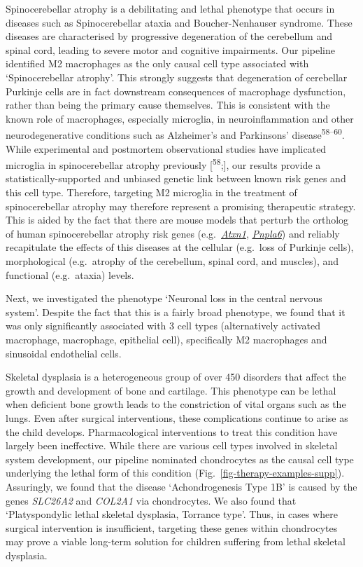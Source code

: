 \documentclass[
]{article}
\begin{document}
Spinocerebellar atrophy is a debilitating and lethal phenotype that
occurs in diseases such as Spinocerebellar ataxia and Boucher-Nenhauser
syndrome. These diseases are characterised by progressive degeneration
of the cerebellum and spinal cord, leading to severe motor and cognitive
impairments. Our pipeline identified M2 macrophages as the only causal
cell type associated with `Spinocerebellar atrophy'. This strongly
suggests that degeneration of cerebellar Purkinje cells are in fact
downstream consequences of macrophage dysfunction, rather than being the
primary cause themselves. This is consistent with the known role of
macrophages, especially microglia, in neuroinflammation and other
neurodegenerative conditions such as Alzheimer's and Parkinsons'
disease\textsuperscript{58--60}. While experimental and postmortem
observational studies have implicated microglia in spinocerebellar
atrophy previously {[}\textsuperscript{58};{]}, our results provide a
statistically-supported and unbiased genetic link between known risk
genes and this cell type. Therefore, targeting M2 microglia in the
treatment of spinocerebellar atrophy may therefore represent a promising
therapeutic strategy. This is aided by the fact that there are mouse
models that perturb the ortholog of human spinocerebellar atrophy risk
genes
(e.g.~\href{https://www.informatics.jax.org/marker/MGI:104783}{\emph{Atxn1}},
\href{https://www.informatics.jax.org/marker/MGI:1354723}{\emph{Pnpla6}})
and reliably recapitulate the effects of this diseases at the cellular
(e.g.~loss of Purkinje cells), morphological (e.g.~atrophy of the
cerebellum, spinal cord, and muscles), and functional (e.g.~ataxia)
levels.

Next, we investigated the phenotype `Neuronal loss in the central
nervous system'. Despite the fact that this is a fairly broad phenotype,
we found that it was only significantly associated with 3 cell types
(alternatively activated macrophage, macrophage, epithelial cell),
specifically M2 macrophages and sinusoidal endothelial cells.

Skeletal dysplasia is a heterogeneous group of over 450 disorders that
affect the growth and development of bone and cartilage. This phenotype
can be lethal when deficient bone growth leads to the constriction of
vital organs such as the lungs. Even after surgical interventions, these
complications continue to arise as the child develops. Pharmacological
interventions to treat this condition have largely been ineffective.
While there are various cell types involved in skeletal system
development, our pipeline nominated chondrocytes as the causal cell type
underlying the lethal form of this condition
(Fig.~\ref{fig-therapy-examples-supp}). Assuringly, we found that the
disease `Achondrogenesis Type 1B' is caused by the genes \emph{SLC26A2}
and \emph{COL2A1} via chondrocytes. We also found that `Platyspondylic
lethal skeletal dysplasia, Torrance type'. Thus, in cases where surgical
intervention is insufficient, targeting these genes within chondrocytes
may prove a viable long-term solution for children suffering from lethal
skeletal dysplasia.
\end{document}
